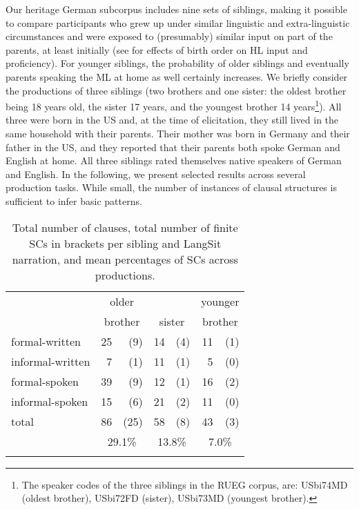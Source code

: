 \documentclass[output=paper]{langscibook}
\begin{document}
Our heritage German subcorpus includes nine sets of siblings, making it possible to compare participants who grew up under similar linguistic and extra-linguistic circumstances and were exposed to (presumably) similar input on part of the parents, at least initially (see \citealt{AalberseEtAl2019, BridgesHoff2014, Shin2002} for effects of birth order on HL input and proficiency). For younger siblings, the probability of older siblings and eventually parents speaking the ML at home as well certainly increases. We briefly consider the productions of three siblings (two brothers and one sister: the oldest brother being 18 years old, the sister 17 years, and the youngest brother 14 years\footnote{The speaker codes of the three siblings in the RUEG corpus, are: USbi74MD (oldest brother), USbi72FD (sister), USbi73MD (youngest brother).}). All three were born in the US and, at the time of elicitation, they still lived in the same household with their parents. Their mother was born in Germany and their father in the US, and they reported that their parents both spoke German and English at home. All three siblings rated themselves native speakers of German and English. In the following, we present selected results across several production tasks. While small, the number of instances of clausal structures is sufficient to infer basic patterns.

\begin{table}
\begin{tabular}{l *3{rr}}
\lsptoprule
               & \multicolumn{2}{c}{older}  &               &            & \multicolumn{2}{c}{younger} \\
               & \multicolumn{2}{c}{brother} & \multicolumn{2}{c}{sister} & \multicolumn{2}{c}{brother}\\\midrule
formal-written   & 25 & (9)         & 14 & (4) & 11 & (1)\\
informal-written & 7  & (1)         & 11 & (1) & 5  & (0)\\
formal-spoken    & 39 & (9)         & 12 & (1) & 16 & (2)\\
informal-spoken  & 15 & (6)         & 21 & (2) & 11 & (0)\\
total            & 86 & (25)        & 58 & (8) & 43 & (3)\\
                 & \multicolumn{2}{c}{29.1\%}  & \multicolumn{2}{c}{13.8\%} & \multicolumn{2}{c}{7.0\%}\\
\lspbottomrule
\end{tabular}
\caption{\label{tab:tsehaye:1}Total number of clauses, total number of finite SCs in brackets per sibling and LangSit narration, and mean percentages of SCs across productions.}
\end{table}
\end{document}
